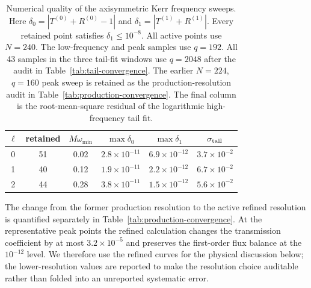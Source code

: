 \documentclass[aps,prd,twocolumn,10pt,nofootinbib,superscriptaddress,floatfix]{revtex4-2}
\begin{document}
\begin{table}[t]
\caption{Numerical quality of the axisymmetric Kerr frequency sweeps.  Here
$\delta_0=|T^{(0)}+R^{(0)}-1|$ and
$\delta_1=|T^{(1)}+R^{(1)}|$.  Every retained point satisfies
$\delta_1\le 10^{-8}$.  All active points use $N=240$.  The low-frequency and
peak samples use $q=192$.  All 43 samples in the three tail-fit windows use
$q=2048$ after the audit in Table~\ref{tab:tail-convergence}.  The earlier
$N=224$, $q=160$ peak sweep is retained as the production-resolution audit in
Table~\ref{tab:production-convergence}.  The final column is the
root-mean-square residual of the logarithmic high-frequency tail fit.}
\label{tab:numerics}
\begin{ruledtabular}
\begin{tabular}{c c c c c c}
$\ell$ & retained & $M\omega_{\min}$ & $\max\delta_0$ & $\max\delta_1$
& $\sigma_{\rm tail}$\\
\hline
0 & 51 & 0.02 & $2.8\times10^{-11}$ & $6.9\times10^{-12}$ & $3.7\times10^{-2}$\\
1 & 40 & 0.12 & $1.9\times10^{-11}$ & $2.2\times10^{-12}$ & $6.7\times10^{-2}$\\
2 & 44 & 0.28 & $3.8\times10^{-11}$ & $1.5\times10^{-12}$ & $5.6\times10^{-2}$\\
\end{tabular}
\end{ruledtabular}
\end{table}

The change from the former production resolution to the active refined
resolution is quantified separately in Table~\ref{tab:production-convergence}.
At the representative peak points the refined calculation changes the
transmission coefficient by at most $3.2\times10^{-5}$ and preserves the
first-order flux balance at the $10^{-12}$ level.  We therefore use the
refined curves for the physical discussion below; the lower-resolution values
are reported to make the resolution choice auditable rather than folded into
an unreported systematic error.
\end{document}
